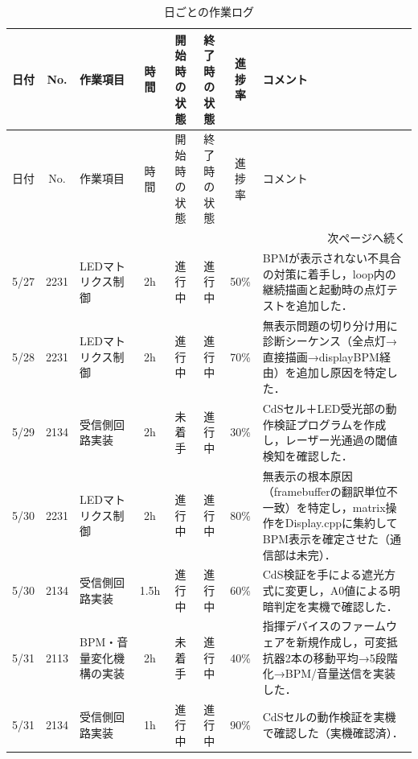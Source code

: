 \documentclass[uplatex,dvipdfmx,a4paper,11pt]{jsarticle}
\begin{document}
    \begin{longtable}{|c|c|p{2.4cm}|c|c|c|c|p{3.8cm}|}
    \caption{日ごとの作業ログ} \\
    \hline
    日付 & No. & 作業項目 & 時間 & 開始時の状態 & 終了時の状態 & 進捗率 & コメント \\
    \hline
    \endfirsthead

    \hline
    日付 & No. & 作業項目 & 時間 & 開始時の状態 & 終了時の状態 & 進捗率 & コメント \\
    \hline
    \endhead

    \hline
    \multicolumn{8}{r}{次ページへ続く} \\
    \hline
    \endfoot

    \hline
    \endlastfoot

    5/27 & 2231 & LEDマトリクス制御 & 2h &
    進行中 &
    進行中 &
    50\% &
    BPMが表示されない不具合の対策に着手し，loop内の継続描画と起動時の点灯テストを追加した． \\
    \hline

    5/28 & 2231 & LEDマトリクス制御 & 2h &
    進行中 &
    進行中 &
    70\% &
    無表示問題の切り分け用に診断シーケンス（全点灯→直接描画→displayBPM経由）を追加し原因を特定した． \\
    \hline

    5/29 & 2134 & 受信側回路実装 & 2h &
    未着手 &
    進行中 &
    30\% &
    CdSセル＋LED受光部の動作検証プログラムを作成し，レーザー光通過の閾値検知を確認した． \\
    \hline

    5/30 & 2231 & LEDマトリクス制御 & 2h &
    進行中 &
    進行中 &
    80\% &
    無表示の根本原因（framebufferの翻訳単位不一致）を特定し，matrix操作をDisplay.cppに集約してBPM表示を確定させた（通信部は未完）． \\
    \hline

    5/30 & 2134 & 受信側回路実装 & 1.5h &
    進行中 &
    進行中 &
    60\% &
    CdS検証を手による遮光方式に変更し，A0値による明暗判定を実機で確認した． \\
    \hline

    5/31 & 2113 & BPM・音量変化機構の実装 & 2h &
    未着手 &
    進行中 &
    40\% &
    指揮デバイスのファームウェアを新規作成し，可変抵抗器2本の移動平均→5段階化→BPM/音量送信を実装した． \\
    \hline

    5/31 & 2134 & 受信側回路実装 & 1h &
    進行中 &
    進行中 &
    90\% &
    CdSセルの動作検証を実機で確認した（実機確認済）． \\
    \hline


\end{longtable}
\end{document}
